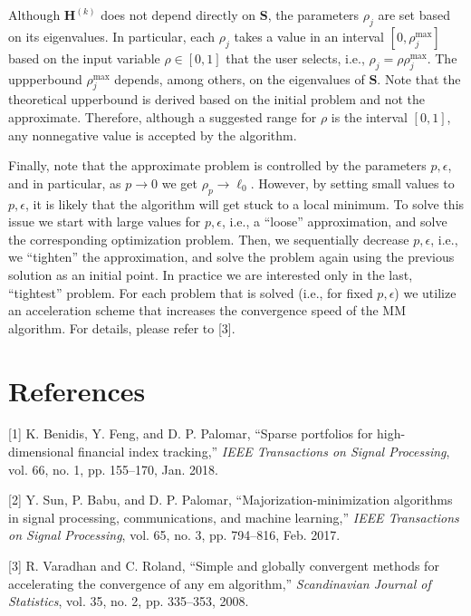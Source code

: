 \documentclass[]{article}
\begin{document}
Although \(\mathbf{H}^{(k)}\) does not depend directly on
\(\mathbf{S}\), the parameters \(\rho_j\) are set based on its
eigenvalues. In particular, each \(\rho_j\) takes a value in an interval
\([0, \rho_j^{\text{max}}]\) based on the input variable
\(\rho\in[0, 1]\) that the user selects, i.e.,
\(\rho_j = \rho\rho_j^{\text{max}}\). The uppperbound
\(\rho_j^{\text{max}}\) depends, among others, on the eigenvalues of
\(\mathbf{S}\). Note that the theoretical upperbound is derived based on
the initial problem and not the approximate. Therefore, although a
suggested range for \(\rho\) is the interval \([0, 1]\), any nonnegative
value is accepted by the algorithm.

Finally, note that the approximate problem is controlled by the
parameters \(p, \epsilon\), and in particular, as \(p\rightarrow0\) we
get \(\rho_p\rightarrow\ell_0\). However, by setting small values to
\(p, \epsilon\), it is likely that the algorithm will get stuck to a
local minimum. To solve this issue we start with large values for
\(p, \epsilon\), i.e., a ``loose'' approximation, and solve the
corresponding optimization problem. Then, we sequentially decrease
\(p, \epsilon\), i.e., we ``tighten'' the approximation, and solve the
problem again using the previous solution as an initial point. In
practice we are interested only in the last, ``tightest'' problem. For
each problem that is solved (i.e., for fixed \(p, \epsilon\)) we utilize
an acceleration scheme that increases the convergence speed of the MM
algorithm. For details, please refer to {[}3{]}.

\section*{References}\label{references}

\setlength{\parindent}{-0.2in} \setlength{\leftskip}{0.2in}
\setlength{\parskip}{8pt} \noindent

\hypertarget{refs}{}
\hypertarget{ref-BenFengPal2018}{}
{[}1{]} K. Benidis, Y. Feng, and D. P. Palomar, ``Sparse portfolios for
high-dimensional financial index tracking,'' \emph{IEEE Transactions on
Signal Processing}, vol. 66, no. 1, pp. 155--170, Jan. 2018.

\hypertarget{ref-SunBabPal2018}{}
{[}2{]} Y. Sun, P. Babu, and D. P. Palomar, ``Majorization-minimization
algorithms in signal processing, communications, and machine learning,''
\emph{IEEE Transactions on Signal Processing}, vol. 65, no. 3, pp.
794--816, Feb. 2017.

\hypertarget{ref-Varadhan2008}{}
{[}3{]} R. Varadhan and C. Roland, ``Simple and globally convergent
methods for accelerating the convergence of any em algorithm,''
\emph{Scandinavian Journal of Statistics}, vol. 35, no. 2, pp. 335--353,
2008.
\end{document}
